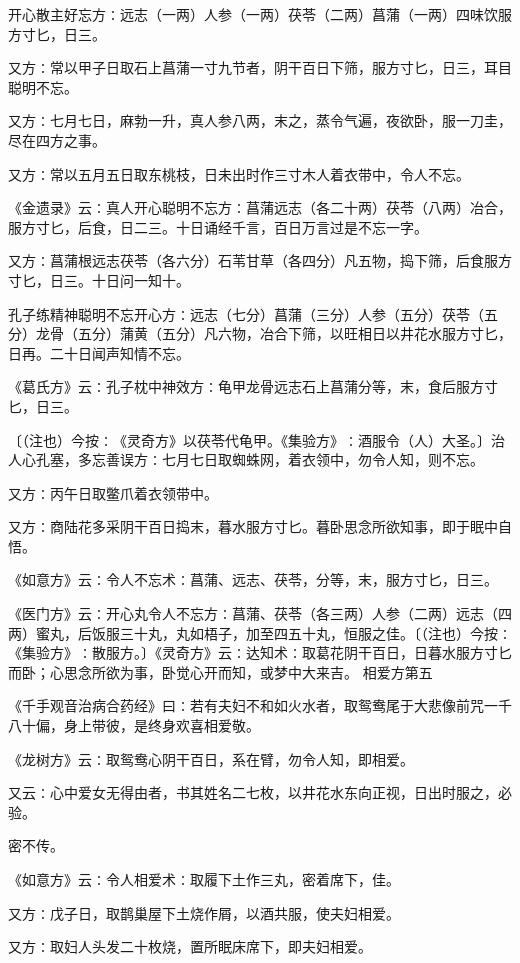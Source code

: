 \documentclass[a4paper,12pt,UTF8,twoside]{ctexbook}
\begin{document}
开心散主好忘方∶远志（一两）人参（一两）茯苓（二两）菖蒲（一两）四味饮服方寸匕，日三。

又方∶常以甲子日取石上菖蒲一寸九节者，阴干百日下筛，服方寸匕，日三，耳目聪明不忘。

又方∶七月七日，麻勃一升，真人参八两，末之，蒸令气遍，夜欲卧，服一刀圭，尽在四方之事。

又方∶常以五月五日取东桃枝，日未出时作三寸木人着衣带中，令人不忘。

《金遗录》云∶真人开心聪明不忘方∶菖蒲远志（各二十两）茯苓（八两）冶合，服方寸匕，后食，日二三。十日诵经千言，百日万言过是不忘一字。

又方∶菖蒲根远志茯苓（各六分）石苇甘草（各四分）凡五物，捣下筛，后食服方寸匕，日三。十日问一知十。

孔子练精神聪明不忘开心方∶远志（七分）菖蒲（三分）人参（五分）茯苓（五分）龙骨（五分）蒲黄（五分）凡六物，冶合下筛，以旺相日以井花水服方寸匕，日再。二十日闻声知情不忘。

《葛氏方》云∶孔子枕中神效方∶龟甲龙骨远志石上菖蒲分等，末，食后服方寸匕，日三。

〔（注也）今按∶《灵奇方》以茯苓代龟甲。《集验方》∶酒服令（人）大圣。〕治人心孔塞，多忘善误方∶七月七日取蜘蛛网，着衣领中，勿令人知，则不忘。

又方∶丙午日取鳖爪着衣领带中。

又方∶商陆花多采阴干百日捣末，暮水服方寸匕。暮卧思念所欲知事，即于眠中自悟。

《如意方》云∶令人不忘术∶菖蒲、远志、茯苓，分等，末，服方寸匕，日三。

《医门方》云∶开心丸令人不忘方∶菖蒲、茯苓（各三两）人参（二两）远志（四两）蜜丸，后饭服三十丸，丸如梧子，加至四五十丸，恒服之佳。〔（注也）今按∶《集验方》∶散服方。〕《灵奇方》云∶达知术∶取葛花阴干百日，日暮水服方寸匕而卧；心思念所欲为事，卧觉心开而知，或梦中大来吉。
相爱方第五

《千手观音治病合药经》曰∶若有夫妇不和如火水者，取鸳鸯尾于大悲像前咒一千八十偏，身上带彼，是终身欢喜相爱敬。

《龙树方》云∶取鸳鸯心阴干百日，系在臂，勿令人知，即相爱。

又云∶心中爱女无得由者，书其姓名二七枚，以井花水东向正视，日出时服之，必验。

密不传。

《如意方》云∶令人相爱术∶取履下土作三丸，密着席下，佳。

又方∶戊子日，取鹊巢屋下土烧作屑，以酒共服，使夫妇相爱。

又方∶取妇人头发二十枚烧，置所眠床席下，即夫妇相爱。
\end{document}
